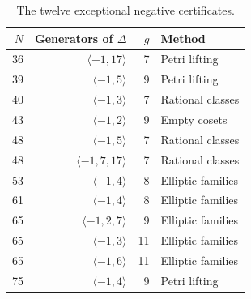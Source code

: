 \begin{table}[!ht]
\centering
\caption{The twelve exceptional negative certificates.}\label{tab:special}
\begin{tabular}{rrrl}
\toprule $N$ & Generators of $\Delta$ & $g$ & Method \\
\midrule
36 & $\langle -1, 17\rangle$ & 7 & Petri lifting \\
39 & $\langle -1, 5\rangle$ & 9 & Petri lifting \\
40 & $\langle -1, 3\rangle$ & 7 & Rational classes \\
43 & $\langle -1, 2\rangle$ & 9 & Empty cosets \\
48 & $\langle -1, 5\rangle$ & 7 & Rational classes \\
48 & $\langle -1, 7, 17\rangle$ & 7 & Rational classes \\
53 & $\langle -1, 4\rangle$ & 8 & Elliptic families \\
61 & $\langle -1, 4\rangle$ & 8 & Elliptic families \\
65 & $\langle -1, 2, 7\rangle$ & 9 & Elliptic families \\
65 & $\langle -1, 3\rangle$ & 11 & Elliptic families \\
65 & $\langle -1, 6\rangle$ & 11 & Elliptic families \\
75 & $\langle -1, 4\rangle$ & 9 & Petri lifting \\
\bottomrule
\end{tabular}
\end{table}

